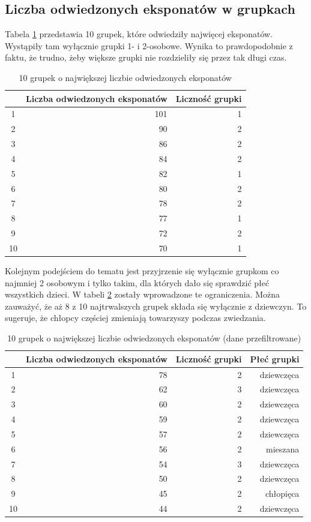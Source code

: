 \documentclass[conference]{IEEEtran}
\begin{document}
\subsection{Liczba odwiedzonych eksponatów w grupkach}
Tabela \ref{top_grupki1} przedstawia 10 grupek, które odwiedziły najwięcej eksponatów. Wystąpiły tam wyłącznie grupki 1- i 2-osobowe. Wynika to prawdopodobnie z faktu, że trudno, żeby większe grupki nie rozdzieliły się przez tak długi czas.
\begin{table}[H]
\caption{10 grupek o największej liczbie odwiedzonych eksponatów}
\label{top_grupki1}
\centering
\begin{tabular}{|c|r|r|}
\hline
 & \textbf{Liczba odwiedzonych eksponatów} & \textbf{Liczność grupki} \\
\hline
 1  &  101 & 1 \\
 2  &   90 & 2 \\
 3  &   86 & 2 \\
 4  &   84 & 2 \\
 5  &   82 & 1 \\
 6  &   80 & 2 \\
 7  &   78 & 2 \\
 8  &   77 & 1 \\
 9  &   72 & 2 \\
 10 &   70 & 1 \\
\hline
\end{tabular}
\end{table}

Kolejnym podejściem do tematu jest przyjrzenie się wyłącznie grupkom co najmniej 2 osobowym i tylko takim, dla których dało się sprawdzić płeć wszystkich dzieci. W tabeli \ref{top_grupki2} zostały wprowadzone te ograniczenia. Można zauważyć, że aż 8 z 10 najtrwalszych grupek składa się wyłącznie z dziewczyn. To sugeruje, że chłopcy częściej zmieniają towarzyszy podczas zwiedzania.

\begin{table}[H]
\caption{10 grupek o największej liczbie odwiedzonych eksponatów (dane przefiltrowane)}
\label{top_grupki2}
\centering
\begin{tabular}{|c|r|r|r|}
\hline
 & \textbf{Liczba odwiedzonych eksponatów} & \textbf{Liczność grupki}  & \textbf{Płeć grupki} \\
\hline
 1  & 78 & 2 & dziewczęca \\
 2  & 62 & 3 & dziewczęca \\
 3  & 60 & 2 & dziewczęca \\
 4  & 59 & 2 & dziewczęca \\
 5  & 57 & 2 & dziewczęca \\
 6  & 56 & 2 & mieszana  \\
 7  & 54 & 3 & dziewczęca \\
 8  & 50 & 2 & dziewczęca \\
 9  & 45 & 2 & chłopięca  \\
 10 & 44 & 2 & dziewczęca \\
\hline
\end{tabular}
\end{table}
\end{document}
